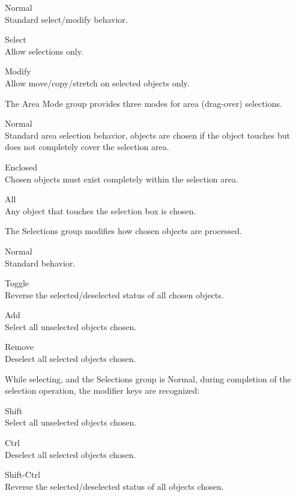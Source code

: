 \begin{description}
\item{\et Normal}\\ Standard select/modify behavior.
\item{\et Select}\\ Allow selections only.
\item{\et Modify}\\ Allow move/copy/stretch on selected objects only.
\end{description}

The {\cb Area Mode} group provides three modes for area (drag-over)
selections.

\begin{description}
\item{\et Normal}\\ Standard area selection behavior, objects are chosen
  if the object touches but does not completely cover the selection
  area.
\item{\et Enclosed}\\ Chosen objects must exist completely within the
  selection area.
\item{\et All}\\ Any object that touches the selection box is chosen.
\end{description}

The {\cb Selections} group modifies how chosen objects are processed.

\begin{description}
\item{\et Normal}\\ Standard behavior.
\item{\et Toggle}\\ Reverse the selected/deselected status of all chosen
  objects.
\item{\et Add}\\ Select all unselected objects chosen.
\item{\et Remove}\\ Deselect all selected objects chosen.
\end{description}

While selecting, and the {\cb Selections} group is {\et Normal},
during completion of the selection operation, the modifier keys are
recognized:

\begin{description}
\item{\kb Shift}\\ Select all unselected objects chosen.
\item{\kb Ctrl}\\ Deselect all selected objects chosen.
\item{\kb Shift-Ctrl}\\ Reverse the selected/deselected status of all
   objects chosen.
\end{description}

